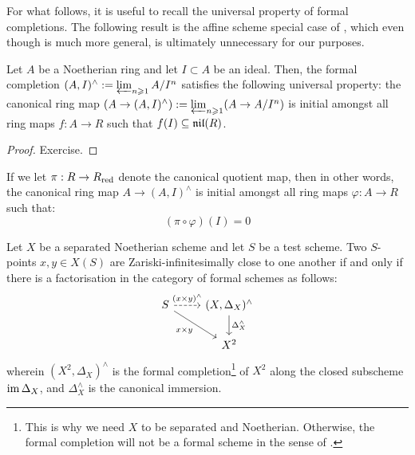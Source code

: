             For what follows, it is useful to recall the universal property of formal completions. The following result is the affine scheme special case of \cite[\href{https://stacks.math.columbia.edu/tag/0AIN}{Tag 0AIN}]{stacks}, which even though is much more general, is ultimately unnecessary for our purposes.
            \begin{lemma} \label{lemma: universal_property_of_formal_completion}
                Let $A$ be a Noetherian ring and let $I \subset A$ be an ideal. Then, the formal completion $(A, I)^{\wedge} := \projlim_{n \geq 1} A/I^n$ satisfies the following universal property: the canonical ring map $(A \to (A, I)^{\wedge}) := \projlim_{n \geq 1} (A \to A/I^n)$ is initial amongst all ring maps $f: A \to R$ such that $f(I) \subseteq \Nil(R)$.
            \end{lemma}
                \begin{proof}
                    Exercise.
                \end{proof}
            \begin{remark}
                If we let $\pi: R \to R_{\red}$ denote the canonical quotient map, then in other words, the canonical ring map $A \to (A, I)^{\wedge}$ is initial amongst all ring maps $\varphi: A \to R$ such that:
                    $$(\pi \circ \varphi)(I) = 0$$
            \end{remark}
            \begin{proposition} \label{prop: infinitesimality_and_the_diagonal}
                Let $X$ be a separated Noetherian scheme and let $S$ be a test scheme. Two $S$-points $x, y \in X(S)$ are Zariski-infinitesimally close to one another if and only if there is a factorisation in the category of formal schemes as follows:
                    $$
                        \begin{tikzcd}
                    	S & {(X, \Delta_X)^{\wedge}} \\
                    	& {X^2}
                    	\arrow["(x \x y)^{\wedge}", dashed, from=1-1, to=1-2]
                    	\arrow["{x \x y}"', from=1-1, to=2-2]
                    	\arrow["{\Delta_X^{\wedge}}", from=1-2, to=2-2]
                        \end{tikzcd}
                    $$
                wherein $(X^2, \Delta_X)^{\wedge}$ is the formal completion\footnote{This is why we need $X$ to be separated and Noetherian. Otherwise, the formal completion will not be a formal scheme in the sense of \cite{hartshorne}.} of $X^2$ along the closed subscheme $\im \Delta_X$, and $\Delta_X^{\wedge}$ is the canonical immersion. 
            \end{proposition}
